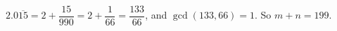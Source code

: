 $2.0\overline{15}=2+\dfrac{15}{990}=2+\dfrac{1}{66}=\dfrac{133}{66}$, and $\gcd(133,66)=1$. So $m+n=\boxed{199}$.
